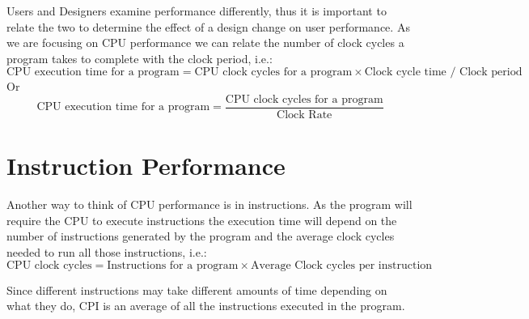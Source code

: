 \documentclass[12pt letter]{report}
\begin{document}
Users and Designers examine performance differently, thus it is important to relate the two to determine the effect of a
design change on user performance. As we are focusing on CPU performance we can relate the number of clock cycles a
program takes to complete with the clock period, i.e.:
\[
  \text{CPU execution time for a program} = \text{CPU clock cycles for a program} \times \text{Clock cycle time / Clock
    period}
\]
Or
\[
  \text{CPU execution time for a program} = \frac{\text{CPU clock cycles for a program}}{\text{Clock Rate}}
\]

\section{Instruction Performance}
Another way to think of CPU performance is in instructions. As the program will require the CPU to execute instructions
the execution time will depend on the number of instructions generated by the program and the average clock cycles
needed to run all those instructions, i.e.:
\[
  \text{CPU clock cycles}  = \text{Instructions for a program} \times  \text{Average Clock cycles per instruction}
\]

Since different instructions may take different amounts of time depending on what they do, CPI is an average of all the
instructions executed in the program.

\end{document}
